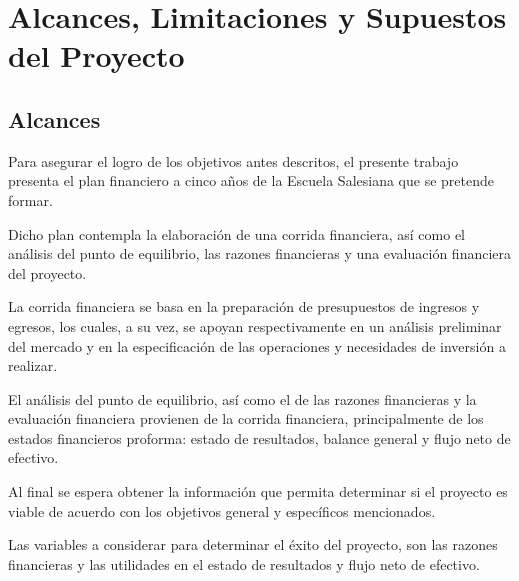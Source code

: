 \section{Alcances, Limitaciones y Supuestos del Proyecto}

\subsection{Alcances}



Para asegurar el logro de los objetivos antes descritos, el presente trabajo presenta el plan financiero a cinco años de la Escuela Salesiana que se pretende formar.


Dicho plan contempla la elaboración de una corrida financiera, así como el análisis del punto de equilibrio, las razones financieras y una evaluación financiera del proyecto.

La corrida financiera se basa en la preparación de presupuestos de ingresos y egresos, los cuales, a su vez, se apoyan respectivamente en un análisis preliminar del mercado y en la especificación de las operaciones y necesidades de inversión a realizar. 

El análisis del punto de equilibrio, así como el de las razones financieras y la evaluación financiera provienen de la corrida financiera, principalmente de los estados financieros proforma: estado de resultados, balance general y flujo neto de efectivo.


Al final se espera obtener la información que permita determinar si el proyecto es viable de acuerdo con los objetivos general y específicos mencionados.


Las variables a considerar para determinar el éxito del proyecto, son las razones financieras y las utilidades en el estado de resultados y flujo neto de efectivo.


